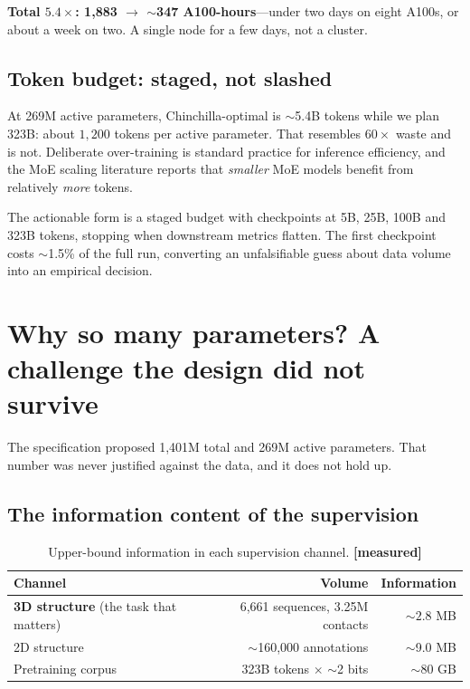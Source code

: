 \documentclass[11pt,a4paper]{article}
\newcommand{\meas}{\textcolor{measured}{\textbf{[measured]}}}
\begin{document}
\noindent\textbf{Total $5.4\times$: 1{,}883 $\rightarrow$ $\sim$347 A100-hours}---under
two days on eight A100s, or about a week on two. A single node for a few days,
not a cluster.

\subsection{Token budget: staged, not slashed}

At 269M active parameters, Chinchilla-optimal is $\sim$5.4B tokens while we plan
323B: about $1{,}200$ tokens per active parameter. That resembles $60\times$
waste and is not. Deliberate over-training is standard practice for inference
efficiency, and the MoE scaling literature reports that \emph{smaller} MoE models
benefit from relatively \emph{more} tokens.

The actionable form is a staged budget with checkpoints at 5B, 25B, 100B and 323B
tokens, stopping when downstream metrics flatten. The first checkpoint costs
$\sim$1.5\% of the full run, converting an unfalsifiable guess about data volume
into an empirical decision.

\section{Why so many parameters? A challenge the design did not survive}
\label{sec:size}

The specification proposed 1{,}401M total and 269M active parameters. That number
was never justified against the data, and it does not hold up.

\subsection{The information content of the supervision}

\begin{table}[h]
\centering
\caption{Upper-bound information in each supervision channel. \meas}
\small
\begin{tabular}{@{}lrr@{}}
\toprule
\textbf{Channel} & \textbf{Volume} & \textbf{Information} \\
\midrule
\textbf{3D structure} (the task that matters) & 6{,}661 sequences, 3.25M contacts & $\mathbf{\sim 2.8}$ MB \\
2D structure & $\sim$160{,}000 annotations & $\sim$9.0 MB \\
Pretraining corpus & 323B tokens $\times$ $\sim$2 bits & $\sim$80 GB \\
\bottomrule
\end{tabular}
\end{table}
\end{document}
